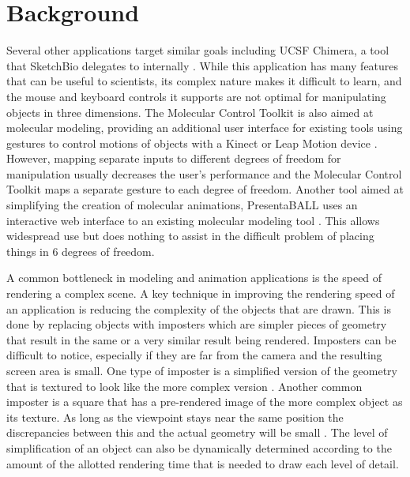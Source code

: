 \documentclass{article} %
\begin{document}
\section{Background}
Several other applications target similar goals including UCSF Chimera, a tool that SketchBio delegates to internally \cite{pettersen2004ucsf}.  While this application has many features that can be useful to scientists, its complex nature makes it difficult to learn, and the mouse and keyboard controls it supports are not optimal for manipulating objects in three dimensions.  The Molecular Control Toolkit is also aimed at molecular modeling, providing an additional user interface for existing tools using gestures to control motions of objects with a Kinect or Leap Motion device \cite{sabirmolecular}.  However, mapping separate inputs to different degrees of freedom for manipulation usually decreases the user's performance\cite{bowman20043d} and the Molecular Control Toolkit maps a separate gesture to each degree of freedom.  Another tool aimed at simplifying the creation of molecular animations, PresentaBALL uses an interactive web interface to an existing molecular modeling tool \cite{nickelspresentaball}.  This allows widespread use but does nothing to assist in the difficult problem of placing things in 6 degrees of freedom.

A common bottleneck in modeling and animation applications is the speed of rendering a complex scene.  A key technique in improving the rendering speed of an application is reducing the complexity of the objects that are drawn.  This is done by replacing objects with imposters which are simpler pieces of geometry that result in the same or a very similar result being rendered.  Imposters can be difficult to notice, especially if they are far from the camera and the resulting screen area is small.  One type of imposter is a simplified version of the geometry that is textured to look like the more complex version \cite{decoret2003billboard}\cite{erikson1998simplification}\cite{cohen1998appearance}.  Another common imposter is a square that has a pre-rendered image of the more complex object as its texture.  As long as the viewpoint stays near the same position the discrepancies between this and the actual geometry will be small \cite{aliaga1996visualization}\cite{maciel1995visual}.  The level of simplification of an object can also be dynamically determined according to the amount of the allotted rendering time that is needed to draw each level of detail.
\end{document}
